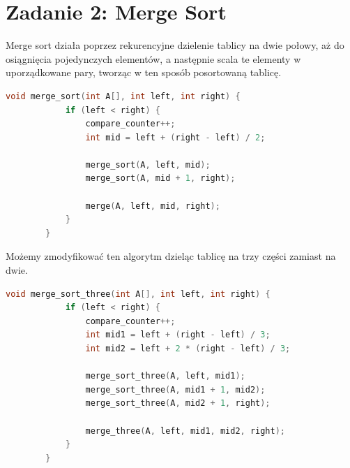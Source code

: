 \documentclass{article}
\theoremstyle{definition}
\begin{document}
\section{Zadanie 2: Merge Sort}
	Merge sort działa poprzez rekurencyjne dzielenie tablicy na dwie połowy, aż do osiągnięcia pojedynczych elementów, a następnie scala te elementy w uporządkowane pary, tworząc w ten sposób posortowaną tablicę.
	\begin{lstlisting}[language=C++, caption={Implementacja Merge Sort}]
		void merge_sort(int A[], int left, int right) {
			if (left < right) {
				compare_counter++;
				int mid = left + (right - left) / 2;
				
				merge_sort(A, left, mid);
				merge_sort(A, mid + 1, right);
				
				merge(A, left, mid, right);
			}
		}
	\end{lstlisting}
	Możemy zmodyfikować ten algorytm dzieląc tablicę na trzy części zamiast na dwie.
	\begin{lstlisting}[language=C++, caption={Implementacja Merge Sort}]
		void merge_sort_three(int A[], int left, int right) {
			if (left < right) {
				compare_counter++;
				int mid1 = left + (right - left) / 3;         
				int mid2 = left + 2 * (right - left) / 3;     
				
				merge_sort_three(A, left, mid1);
				merge_sort_three(A, mid1 + 1, mid2);
				merge_sort_three(A, mid2 + 1, right);
				
				merge_three(A, left, mid1, mid2, right);
			}
		}
	\end{lstlisting}
\end{document}
